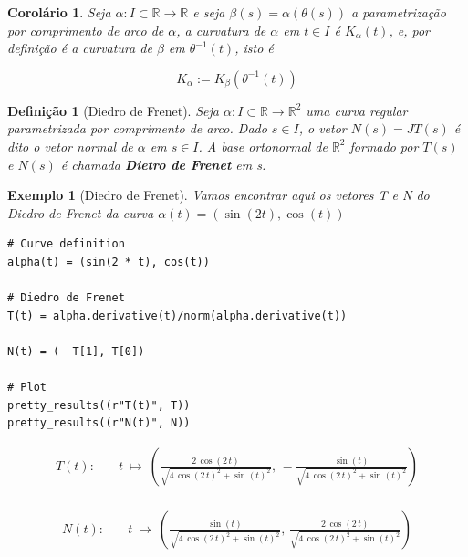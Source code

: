 \documentclass[12pt]{article}
\newtheorem{ex}{Exemplo}[section]
\newtheorem{corollary}{Corolário}[theorem]
\newtheorem{definition}{Definição}
\begin{document}
\begin{corollary}
Seja $\alpha : I \subset \mathbb{R} \rightarrow \mathbb{R}$ e seja $\beta(s) = \alpha(\theta(s))$ a parametrização por comprimento de arco de $\alpha$, a curvatura de $\alpha$ em $t \in I$ é $K_\alpha(t)$, e, por definição é a curvatura de $\beta$ em $\theta^{-1}(t)$, isto é

$$K_\alpha := K_\beta(\theta^{-1}(t))$$
\end{corollary}

\begin{definition}[Diedro de Frenet]
Seja $\alpha: I \subset \mathbb{R} \rightarrow \mathbb{R}^2$ uma curva regular parametrizada por comprimento de arco. Dado $s \in I$, o vetor $N(s) = JT(s)$ é dito o vetor normal de $\alpha$ em $s \in I$. A base ortonormal de $\mathbb{R}^2$ formado por $T(s)$ e $N(s)$ é chamada \textbf{Dietro de Frenet} em s.
\end{definition}

\begin{ex}[Diedro de Frenet] Vamos encontrar aqui os vetores T e N do Diedro de Frenet da curva $\alpha(t) = (\sin(2 t), \cos(t))$

\begin{lstlisting}
# Curve definition
alpha(t) = (sin(2 * t), cos(t))

# Diedro de Frenet
T(t) = alpha.derivative(t)/norm(alpha.derivative(t))

N(t) = (- T[1], T[0])

# Plot
pretty_results((r"T(t)", T))
pretty_results((r"N(t)", N))
\end{lstlisting}

\newcommand{\Bold}[1]{\mathbf{#1}}\begin{align*} T(t) :& \quad t \ {\mapsto}\ \left(\frac{2 \, \cos\left(2 \, t\right)}{\sqrt{4 \, \cos\left(2 \, t\right)^{2} + \sin\left(t\right)^{2}}},\,-\frac{\sin\left(t\right)}{\sqrt{4 \, \cos\left(2 \, t\right)^{2} + \sin\left(t\right)^{2}}}\right) \\ \end{align*}

\begin{align*} N(t) :& \quad t \ {\mapsto}\ \left(\frac{\sin\left(t\right)}{\sqrt{4 \, \cos\left(2 \, t\right)^{2} + \sin\left(t\right)^{2}}},\,\frac{2 \, \cos\left(2 \, t\right)}{\sqrt{4 \, \cos\left(2 \, t\right)^{2} + \sin\left(t\right)^{2}}}\right) \\ \end{align*} \\
\end{ex}
\end{document}
